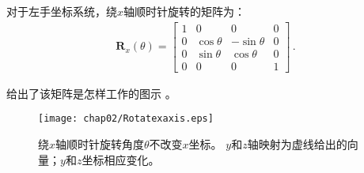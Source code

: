 对于左手坐标系统，绕$x$轴顺时针旋转的矩阵为：
\begin{align*}
    \bm R_x(\theta)=\left[
        \begin{array}{cccc}
            1 & 0          & 0           & 0 \\
            0 & \cos\theta & -\sin\theta & 0 \\
            0 & \sin\theta & \cos\theta  & 0 \\
            0 & 0          & 0           & 1
        \end{array}
        \right]\, .
\end{align*}

给出了该矩阵是怎样工作的图示
。
\begin{figure}[htbp]
    \centering\texttt{[image: chap02/Rotatexaxis.eps]}
    \caption{绕$x$轴顺时针旋转角度$\theta$不改变$x$坐标。
        $y$和$z$轴映射为虚线给出的向量；$y$和$z$坐标相应变化。}
    \label{fig:2.11}
\end{figure}